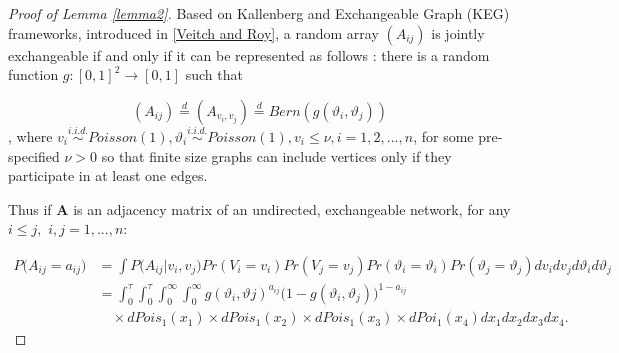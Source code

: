 \documentclass[12pt]{article}
\theoremstyle{definition}
\begin{document}
\begin{proof}[Proof of Lemma \ref{lemma2}]
Based on Kallenberg and Exchangeable Graph (KEG) frameworks, introduced in \href{http://arxiv.org/abs/1512.03099}{[Veitch and Roy]}, a random array $(A_{ij})$ is jointly exchangeable if and only if it can be represented as follows : there is a random function $g : [0,1]^2 \rightarrow [0,1]$ such that 

\begin{equation}
(A_{ij})  \stackrel{d}{=} (A_{v_{i}, v_{j}} )  \stackrel{d}{=} Bern( g( \vartheta_{i}, \vartheta_{j}))
\end{equation}
, where $v_{i} \overset{i.i.d.}{\sim} Poisson(1), \vartheta_{i} \overset{i.i.d.}{\sim} Poisson(1), v_{i} \leq \nu, i = 1,2,... , n$, for some pre-specified $\nu >0$ so that finite size graphs can include vertices only if they participate in at least one edges. 

Thus if $\mathbf{A}$ is an adjacency matrix of an undirected, exchangeable network, for any $i \leq j,$ $i,j = 1,... , n$:


\begin{equation}
\begin{split}
P \big(  A_{ij} = a_{ij} \big) & = \int P \big( A_{ij} \big| v_{i}, v_{j} \big) Pr(V_{i} = v_{i}) Pr(V_{j} = v_{j}) Pr(\vartheta_{i} = \vartheta_{i}) Pr(\vartheta_{j} = \vartheta_{j})   dv_{i} dv_{j} d\vartheta_{i} d\vartheta_{j}   \\ & = \int_{0}^{\tau} \int_{0}^{\tau} \int_{0}^{\infty} \int_{0}^{\infty}  g( \vartheta_{i},  \vartheta{j})^{a_{ij}} \big( 1- g( \vartheta_{i},  \vartheta_{j}) \big)^{1-a_{ij}}  \\ & \quad \times dPois_{1}(x_{1}) \times dPois_{1}(x_{2}) \times dPois_{1}(x_{3}) \times dPoi_{1}(x_{4})  dx_{1} dx_{2} dx_{3} dx_{4}.
\end{split}
\end{equation}



\end{proof}
\end{document}
